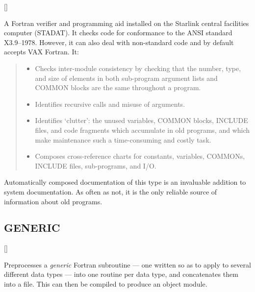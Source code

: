 \vspace{-10mm}

\hfill []

\vspace{2mm}

A Fortran verifier and programming aid installed on the Starlink central
facilities computer (STADAT).
It checks code for conformance to the ANSI standard X3.9--1978.
However, it can also deal with non-standard code and by default accepts VAX
Fortran.
It:

\begin{small}
\begin{quote}
\begin{itemize}
\item Checks inter-module consistency by checking that the number, type, and
 size of elements in both sub-program argument lists and COMMON blocks are the
 same throughout a program.
\item Identifies recursive calls and misuse of arguments.
\item Identifies `clutter': the unused variables, COMMON blocks, INCLUDE
 files, and code fragments which accumulate in old programs, and which make
 maintenance such a time-consuming and costly task.
\item Composes cross-reference charts for constants, variables, COMMONs,
 INCLUDE files, sub-programs, and I/O.
\end{itemize}
\end{quote}
\end{small}

Automatically composed documentation of this type is an invaluable addition
to system documentation.
As often as not, it is the only reliable source of information about old
programs.

\subsection{GENERIC}

\vspace{-10mm}

\hfill []

\vspace{2mm}

Preprocesses a {\it generic} Fortran subroutine --- one written so as to apply
to several different data types --- into one routine per data type, and
concatenates them into a file.
This can then be compiled to produce an object module.

